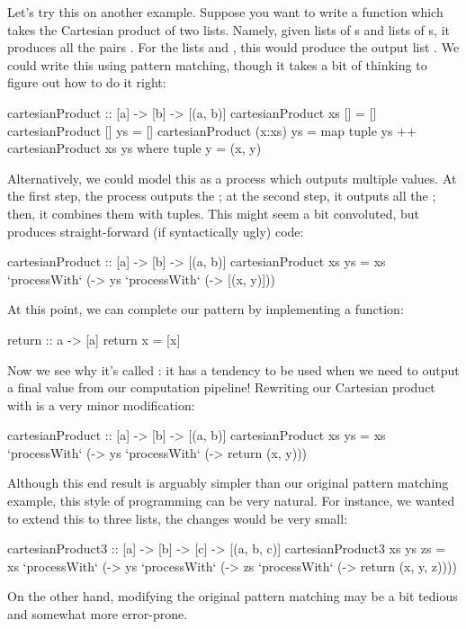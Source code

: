 Let's try this on another example. Suppose you want to write a function which takes the Cartesian
product of two lists. Namely, given lists of s and lists of s, it produces all
the  pairs . For the lists  and , this
would produce the output list . We could
write this using pattern matching, though it takes a bit of thinking to figure out how to do it
right:
\begin{haskell}
cartesianProduct :: [a] -> [b] -> [(a, b)]
cartesianProduct xs [] = []
cartesianProduct [] ys = []
cartesianProduct (x:xs) ys = map tuple ys ++ cartesianProduct xs ys
  where
    tuple y = (x, y)
\end{haskell}
Alternatively, we could model this as a process which outputs multiple values. At the first step,
the process outputs the ; at the second step, it outputs all the ; then, it
combines them with tuples. This might seem a bit convoluted, but produces straight-forward (if
syntactically ugly) code:
\begin{haskell}
cartesianProduct :: [a] -> [b] -> [(a, b)]
cartesianProduct xs ys =
  xs `processWith` (\x ->
  ys `processWith` (\y ->
  [(x, y)]))
\end{haskell}
At this point, we can complete our pattern by implementing a  function:
\begin{haskell}
return :: a -> [a]
return x = [x]
\end{haskell}
Now we see why it's called : it has a tendency to be used when we need to output a
final value from our computation pipeline! Rewriting our Cartesian product with  is a very
minor modification:
\begin{haskell}
cartesianProduct :: [a] -> [b] -> [(a, b)]
cartesianProduct xs ys =
  xs `processWith` (\x ->
  ys `processWith` (\y ->
  return (x, y)))
\end{haskell}
Although this end result is arguably simpler than our original pattern matching example, this style
of programming can be very natural. For instance, we wanted to extend this to three lists, the
changes would be very small:
\begin{haskell}
cartesianProduct3 :: [a] -> [b] -> [c] -> [(a, b, c)]
cartesianProduct3 xs ys zs =
  xs `processWith` (\x ->
  ys `processWith` (\y ->
  zs `processWith` (\z ->
  return (x, y, z))))
\end{haskell}
On the other hand, modifying the original pattern matching  may be a bit
tedious and somewhat more error-prone.


